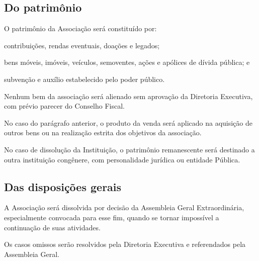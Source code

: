\documentclass{estatuto}
\begin{document}
\begin{artigos}
		\section{Do patrimônio}
			\item O patrimônio da Associação será constituído por:
				\begin{itens}
					\item contribuições, rendas eventuais, doações e legados;
					\item bens móveis, imóveis, veículos, semoventes, ações e apólices de dívida pública; e
					\item subvenção e auxílio estabelecido pelo poder público.
				\end{itens}
				\begin{paragrafos}
					\item Nenhum bem da associação será alienado sem aprovação da Diretoria Executiva, com prévio parecer do Conselho Fiscal.
					\item No caso do parágrafo anterior, o produto da venda será aplicado na aquisição de outros bens ou na realização estrita dos objetivos da associação.
				\end{paragrafos}
			\item No caso de dissolução da Instituição, o patrimônio remanescente será destinado a outra instituição congênere, com personalidade jurídica ou entidade Pública.
		\section{Das disposições gerais}
			\item A Associação será dissolvida por decisão da Assembleia Geral Extraordinária, especialmente convocada para esse fim, quando se tornar impossível a continuação de suas atividades.
			\item Os casos omissos serão resolvidos pela Diretoria Executiva e referendados pela Assembleia Geral.
		\chapter{} %
	\end{artigos}
\end{document}
